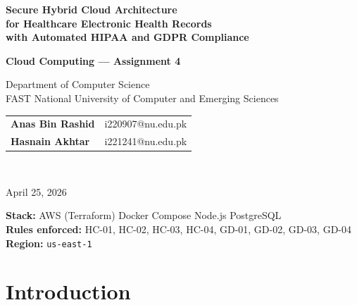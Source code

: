 \documentclass[12pt,a4paper]{article}
\begin{document}

\begin{titlepage}
  \centering
  \vspace*{1.5cm}
  {\LARGE\bfseries Secure Hybrid Cloud Architecture\\[0.4em]
   for Healthcare Electronic Health Records\\[0.4em]
   with Automated HIPAA and GDPR Compliance\par}
  \vspace{1.2cm}
  {\large\textbf{Cloud Computing --- Assignment 4}\par}
  \vspace{0.5cm}
  {\large Department of Computer Science\\
   FAST National University of Computer and Emerging Sciences\par}
  \vspace{1.2cm}
  \begin{tabular}{ll}
    \textbf{Anas Bin Rashid} & i220907@nu.edu.pk \\[0.3em]
    \textbf{Hasnain Akhtar}  & i221241@nu.edu.pk \\
  \end{tabular}
  \vspace{1.2cm}\\
  {\large April 25, 2026\par}
  \vfill
  \begin{mdframed}[linecolor=awsorange,linewidth=2pt,roundcorner=6pt]
    \centering\small
    \textbf{Stack:} AWS (Terraform) \textbullet{} Docker Compose \textbullet{}
    Node.js \textbullet{} PostgreSQL\\
    \textbf{Rules enforced:} HC-01, HC-02, HC-03, HC-04, GD-01, GD-02, GD-03, GD-04\\
    \textbf{Region:} \texttt{us-east-1}
  \end{mdframed}
\end{titlepage}

\tableofcontents
\newpage

\section{Introduction}
\end{document}
